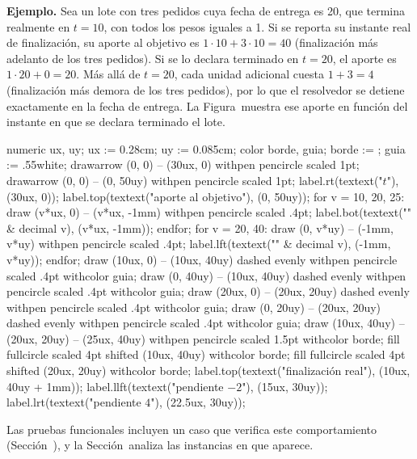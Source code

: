 {\bf Ejemplo.} Sea un lote con tres pedidos cuya fecha de entrega es
20, que termina realmente en $t = 10$, con todos los pesos iguales a 1. Si se
reporta su instante real de finalización, su aporte al objetivo es
$1 \cdot 10 + 3 \cdot 10 = 40$ (finalización más adelanto de los tres
pedidos). Si se lo declara terminado en $t = 20$, el aporte es
$1 \cdot 20 + 0 = 20$. Más allá de $t = 20$, cada unidad adicional cuesta
$1 + 3 = 4$ (finalización más demora de los tres pedidos), por lo que el
resolvedor se detiene exactamente en la fecha de entrega. La
Figura~ muestra ese aporte en función del instante en
que se declara terminado el lote.

{\startMPcode
numeric ux, uy; ux := 0.28cm; uy := 0.085cm;
color borde, guia; borde := ; guia := .55white;
drawarrow (0, 0) -- (30ux, 0) withpen pencircle scaled 1pt;
drawarrow (0, 0) -- (0, 50uy) withpen pencircle scaled 1pt;
label.rt(textext("$t$"), (30ux, 0));
label.top(textext("\tfx aporte al objetivo"), (0, 50uy));
for v = 10, 20, 25:
  draw (v*ux, 0) -- (v*ux, -1mm) withpen pencircle scaled .4pt;
  label.bot(textext("\tfx " & decimal v), (v*ux, -1mm));
endfor;
for v = 20, 40:
  draw (0, v*uy) -- (-1mm, v*uy) withpen pencircle scaled .4pt;
  label.lft(textext("\tfx " & decimal v), (-1mm, v*uy));
endfor;
draw (10ux, 0) -- (10ux, 40uy) dashed evenly withpen pencircle scaled .4pt withcolor guia;
draw (0, 40uy) -- (10ux, 40uy) dashed evenly withpen pencircle scaled .4pt withcolor guia;
draw (20ux, 0) -- (20ux, 20uy) dashed evenly withpen pencircle scaled .4pt withcolor guia;
draw (0, 20uy) -- (20ux, 20uy) dashed evenly withpen pencircle scaled .4pt withcolor guia;
draw (10ux, 40uy) -- (20ux, 20uy) -- (25ux, 40uy) withpen pencircle scaled 1.5pt withcolor borde;
fill fullcircle scaled 4pt shifted (10ux, 40uy) withcolor borde;
fill fullcircle scaled 4pt shifted (20ux, 20uy) withcolor borde;
label.top(textext("\tfx finalización real"), (10ux, 40uy + 1mm));
label.llft(textext("\tfx pendiente $-2$"), (15ux, 30uy));
label.lrt(textext("\tfx pendiente $4$"), (22.5ux, 30uy));
\stopMPcode}


Las pruebas funcionales incluyen un caso que verifica este comportamiento
(Sección~), y la Sección~
analiza las instancias en que aparece.


